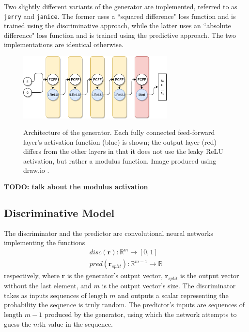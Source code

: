 \documentclass[12pt, titlepage]{report}
\theoremstyle{definition}
\begin{document}
Two slightly different variants of the generator are implemented, referred to as \texttt{jerry} and \texttt{janice}. The former uses a ``squared difference" loss function and is trained using the discriminative approach, while the latter uses an ``absolute difference" loss function and is trained using the predictive approach. The two implementations are identical otherwise.

\begin{figure}
\centering
\includegraphics[width=0.7\textwidth]{img/generator.png}\\
\caption{Architecture of the generator. Each fully connected feed-forward layer's activation function (blue) is shown; the output layer (red) differs from the other layers in that it does not use the leaky ReLU activation, but rather a modulus function. Image produced using draw.io \cite{jgraph2018draw}.}
\label{figure:architecture_generator}
\end{figure}

\textbf{TODO: talk about the modulus activation}



\subsection{Discriminative Model}
The discriminator and the predictor are convolutional neural networks implementing the functions
\begin{gather}
disc(\bm{r}) : \mathbb{R}^m \rightarrow [0, 1] \\
pred(\bm{r}_{split}) : \mathbb{R}^{m - 1} \rightarrow \mathbb{R}
\end{gather}
respectively, where $\bm{r}$ is the generator's output vector, $\bm{r}_{split}$ is the output vector without the last element, and $m$ is the output vector's size. The discriminator takes as inputs sequences of length $m$ and outputs a scalar representing the probability the sequence is truly random. The predictor's inputs are sequences of length $m-1$ produced by the generator, using which the network attempts to guess the $m$th value in the sequence.
\end{document}
